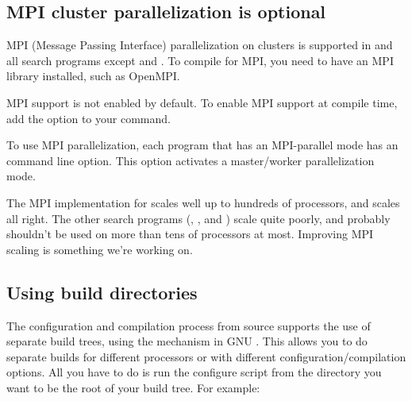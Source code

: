 \subsection{MPI cluster parallelization is optional}

MPI (Message Passing Interface) parallelization on clusters is
supported in  and all search programs except  and
. To compile for MPI, you need to have an MPI library
installed, such as OpenMPI.

MPI support is not enabled by default.  To enable MPI support at
compile time, add the  option to your
 command.

To use MPI parallelization, each program that has an MPI-parallel mode
has an  command line option. This option activates a
master/worker parallelization mode.

The MPI implementation for  scales well up to hundreds
of processors, and  scales all right. The other search
programs (, , and ) scale
quite poorly, and probably shouldn't be used on more than tens of
processors at most. Improving MPI scaling is something we're working on.


\subsection{Using build directories}

The configuration and compilation process from source supports the use
of separate build trees, using the  mechanism in GNU
. This allows you to do separate builds for different
processors or with different configuration/compilation options. All
you have to do is run the configure script from the directory you want
to be the root of your build tree.  For example:

  \vspace{1ex}
  \\
  \\
  \\
  \vspace{1ex}

